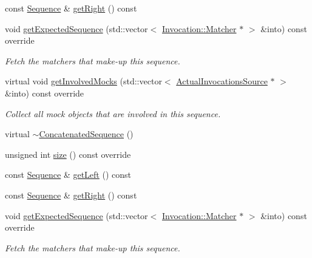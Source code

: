 \begin{DoxyCompactItemize}
\item 
const \mbox{\hyperlink{classfakeit_1_1Sequence}{Sequence}} \& \mbox{\hyperlink{classfakeit_1_1ConcatenatedSequence_a7b1ed9161c972e43fdf2e4cfecbe5bd7}{get\+Right}} () const
\item 
void \mbox{\hyperlink{classfakeit_1_1ConcatenatedSequence_a176b1d4dac2e552f646c2c3ce98f0d1f}{get\+Expected\+Sequence}} (std\+::vector$<$ \mbox{\hyperlink{structfakeit_1_1Invocation_1_1Matcher}{Invocation\+::\+Matcher}} $\ast$ $>$ \&into) const override
\begin{DoxyCompactList}\small\item\em Fetch the matchers that make-\/up this sequence. \end{DoxyCompactList}\item 
virtual void \mbox{\hyperlink{classfakeit_1_1ConcatenatedSequence_a3b475e68ab4f750f2d4946e4777ebe30}{get\+Involved\+Mocks}} (std\+::vector$<$ \mbox{\hyperlink{structfakeit_1_1ActualInvocationsSource}{Actual\+Invocations\+Source}} $\ast$ $>$ \&into) const override
\begin{DoxyCompactList}\small\item\em Collect all mock objects that are involved in this sequence. \end{DoxyCompactList}\item 
virtual \mbox{\hyperlink{classfakeit_1_1ConcatenatedSequence_a22346ae8c3c2af91f26144338750be25}{$\sim$\+Concatenated\+Sequence}} ()
\item 
unsigned int \mbox{\hyperlink{classfakeit_1_1ConcatenatedSequence_aa1dba1b0274b30626ceab3a743c8105a}{size}} () const override
\item 
const \mbox{\hyperlink{classfakeit_1_1Sequence}{Sequence}} \& \mbox{\hyperlink{classfakeit_1_1ConcatenatedSequence_aee102fbcc892783441a36082e1a22789}{get\+Left}} () const
\item 
const \mbox{\hyperlink{classfakeit_1_1Sequence}{Sequence}} \& \mbox{\hyperlink{classfakeit_1_1ConcatenatedSequence_a7b1ed9161c972e43fdf2e4cfecbe5bd7}{get\+Right}} () const
\item 
void \mbox{\hyperlink{classfakeit_1_1ConcatenatedSequence_a176b1d4dac2e552f646c2c3ce98f0d1f}{get\+Expected\+Sequence}} (std\+::vector$<$ \mbox{\hyperlink{structfakeit_1_1Invocation_1_1Matcher}{Invocation\+::\+Matcher}} $\ast$ $>$ \&into) const override
\begin{DoxyCompactList}\small\item\em Fetch the matchers that make-\/up this sequence. \end{DoxyCompactList}\item 

\end{DoxyCompactItemize}
